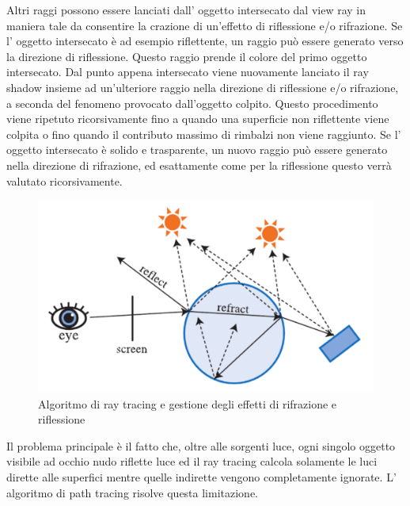 Altri raggi possono essere lanciati dall’ oggetto intersecato dal view ray in maniera tale da consentire la crazione di un’effetto di riflessione e/o rifrazione.
Se l’ oggetto intersecato è ad esempio riflettente, un raggio può essere generato verso la direzione di riflessione.
Questo raggio prende il colore del primo oggetto intersecato. Dal punto appena intersecato viene nuovamente lanciato il ray shadow insieme ad un’ulteriore raggio nella direzione di riflessione e/o rifrazione, a seconda del fenomeno provocato dall’oggetto colpito. Questo procedimento viene ripetuto ricorsivamente fino a quando una superficie non riflettente viene colpita o fino quando il contributo massimo di rimbalzi non viene raggiunto.
Se l’ oggetto intersecato è solido e trasparente, un nuovo raggio può essere generato nella direzione di rifrazione, ed esattamente come per la riflessione questo verrà valutato ricorsivamente.
\\
\begin{figure}[htb]
 \centering
 \includegraphics[width=0.8\linewidth]{images/chapter_stato_arte/stato_arte_refr_refl.png}\hfill
 \caption[Ray tracing ed effetti di rifrazione/riflessione]{Algoritmo di ray tracing e gestione degli effetti di rifrazione e riflessione}
 \label{fig:stato_arte_refr_refl}
\end{figure}

Il problema principale è il fatto che, oltre alle sorgenti luce, ogni singolo oggetto visibile ad occhio nudo riflette luce ed il ray tracing calcola solamente le luci dirette alle superfici mentre quelle indirette vengono completamente ignorate. L’ algoritmo di path tracing risolve questa limitazione.